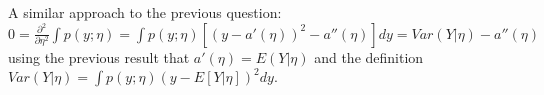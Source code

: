 %
%
\begin{answer}
A similar approach to the previous question: $0 = \frac{\partial^2}{\partial \eta^2} \int p(y;\eta) = \int p(y;\eta) [ (y - a'(\eta))^2 - a''(\eta)] dy = Var(Y|\eta) - a''(\eta)$ using the previous result that $a'(\eta)=E(Y|\eta)$ and the definition $Var(Y|\eta) = \int p(y;\eta) (y - E[Y|\eta])^2 dy$.
\end{answer}
%